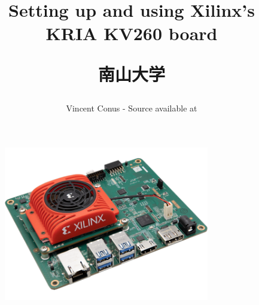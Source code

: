 \documentclass[10pt]{article}
\title{Setting up and using Xilinx's KRIA KV260 board \\
  [1ex] \large \begin{CJK}{UTF8}{min}南山大学\end{CJK}}
\date{}
\author{Vincent Conus  -  Source available at
  \gitlab{https://gitlab.com/sunoc/xilinx-kria-kv260-documentation}}
\begin{document}
\maketitle
\vspace{4cm}
\begin{figure}[H]
  \centering
  \includegraphics[width=0.8\textwidth]{./img/board}
\end{figure}

\pagebreak
\tableofcontents



\end{document}

